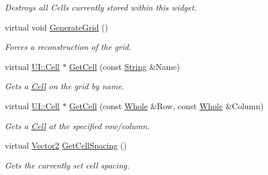 \begin{DoxyCompactItemize}
\begin{DoxyCompactList}\small\item\em Destroys all Cells currently stored within this widget. \item\end{DoxyCompactList}\item 
\hypertarget{classMezzanine_1_1UI_1_1CellGrid_a92b5d5a1d709c9e7419c51c6db5a3724}{
virtual void \hyperlink{classMezzanine_1_1UI_1_1CellGrid_a92b5d5a1d709c9e7419c51c6db5a3724}{GenerateGrid} ()}
\label{classMezzanine_1_1UI_1_1CellGrid_a92b5d5a1d709c9e7419c51c6db5a3724}

\begin{DoxyCompactList}\small\item\em Forces a reconstruction of the grid. \item\end{DoxyCompactList}\item 
virtual \hyperlink{classMezzanine_1_1UI_1_1Cell}{UI::Cell} $\ast$ \hyperlink{classMezzanine_1_1UI_1_1CellGrid_a5d6f3a71557437f087b83698e4cdc69c}{GetCell} (const \hyperlink{namespaceMezzanine_acf9fcc130e6ebf08e3d8491aebcf1c86}{String} \&Name)
\begin{DoxyCompactList}\small\item\em Gets a \hyperlink{classMezzanine_1_1UI_1_1Cell}{Cell} on the grid by name. \item\end{DoxyCompactList}\item 
virtual \hyperlink{classMezzanine_1_1UI_1_1Cell}{UI::Cell} $\ast$ \hyperlink{classMezzanine_1_1UI_1_1CellGrid_ab53b9ca40c4c7a2133f9cc6511842caf}{GetCell} (const \hyperlink{namespaceMezzanine_adcbb6ce6d1eb4379d109e51171e2e493}{Whole} \&Row, const \hyperlink{namespaceMezzanine_adcbb6ce6d1eb4379d109e51171e2e493}{Whole} \&Column)
\begin{DoxyCompactList}\small\item\em Gets a \hyperlink{classMezzanine_1_1UI_1_1Cell}{Cell} at the specified row/column. \item\end{DoxyCompactList}\item 
virtual \hyperlink{classMezzanine_1_1Vector2}{Vector2} \hyperlink{classMezzanine_1_1UI_1_1CellGrid_a23d22d0dc36a1dc021a1a832e86d5337}{GetCellSpacing} ()
\begin{DoxyCompactList}\small\item\em Gets the currently set cell spacing. \item\end{DoxyCompactList}\item 

\end{DoxyCompactItemize}
